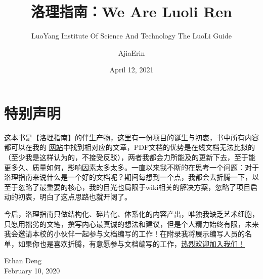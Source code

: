 \documentclass[lang=cn,11pt,chinese]{elegantbook}
\title{洛理指南：We Are Luoli Ren}
\subtitle{LuoYang Institute Of Science And Technology The LuoLi Guide}
\institute{Ajia Network Technology Studio}
\date{April 12, 2021}
\author{AjiaErin}
\begin{document}
\maketitle
\frontmatter

\chapter*{特别声明}

这本书是【洛理指南】的伴生产物，\href{https://wiki.iluoli.ren/feeling/start.html}{这里}有一份项目的诞生与初衷，书中所有内容都可以在我的 \href{https://iluoli.ren/}{网站}中找到相对应的文章，PDF文档的优势是在线文档无法比拟的（至少我是这样认为的，不接受反驳），两者我都会力所能及的更新下去，至于能更多久、质量如何，影响因素太多太多。一直以来我不断的在思考一个问题：对于洛理指南来说什么是一个好的文档呢？期间每想到一个点，我都会去折腾一下，以至于忽略了最重要的核心，我的目光也局限于wiki相关的解决方案，忽略了项目启动的初衷，明白了这点思路也就开阔了。

今后，洛理指南只做结构化、碎片化、体系化的内容产出，唯独我缺乏艺术细胞，只愿用拙劣的文笔，撰写内心最真诚的想法和建议，但是个人精力始终有限，未来我会邀请本校的小伙伴一起参与文档编写的工作！在附录我将展示编写人员的名单，如果你也是喜欢折腾，有意愿参与文档编写的工作，\underline{热烈欢迎加入\href{http://mail.qq.com/cgi-bin/qm_share?t=qm_mailme&email=_J_Zl5mSkZm4iYnWm5eV}{我们}！}



\vskip 1.5cm

\begin{flushright}
Ethan Deng\\
February 10, 2020
\end{flushright}

\tableofcontents

\mainmatter
\end{document}
